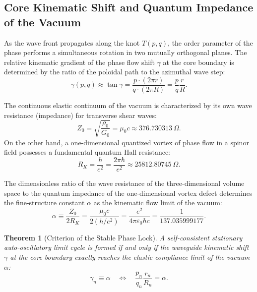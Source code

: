 \documentclass[12pt,a4paper]{article}
\newtheorem{theorem}{Theorem}
\begin{document}
	\subsection{Core Kinematic Shift and Quantum Impedance of the Vacuum}
	As the wave front propagates along the knot $T(p,q)$, the order parameter of the phase performs a simultaneous rotation in two mutually orthogonal planes. The relative kinematic gradient of the phase flow shift $\gamma$ at the core boundary is determined by the ratio of the poloidal path to the azimuthal wave step:
	\begin{equation}
		\gamma(p,q) \approx \tan\gamma = \frac{p \cdot (2\pi r)}{q \cdot (2\pi R)} = \frac{p}{q} \frac{r}{R}.
	\end{equation}
	
	The continuous elastic continuum of the vacuum is characterized by its own wave resistance (impedance) for transverse shear waves:
	\begin{equation}
		Z_0 = \sqrt{\frac{\rho_0}{G_0}} = \mu_0 c \approx 376.730313 \ \Omega.
	\end{equation}
	On the other hand, a one-dimensional quantized vortex of phase flow in a spinor field possesses a fundamental quantum Hall resistance:
	\begin{equation}
		R_K = \frac{h}{e^2} = \frac{2\pi \hbar}{e^2} \approx 25812.80745 \ \Omega.
	\end{equation}
	
	The dimensionless ratio of the wave resistance of the three-dimensional volume space to the quantum impedance of the one-dimensional vortex defect determines the fine-structure constant $\alpha$ as the kinematic flow limit of the vacuum:
	\begin{equation}
		\alpha \equiv \frac{Z_0}{2 R_K} = \frac{\mu_0 c}{2 (h/e^2)} = \frac{e^2}{4\pi \varepsilon_0 \hbar c} = \frac{1}{137.035999177}.
	\end{equation}
	
	\begin{theorem}[Criterion of the Stable Phase Lock]
	A self-consistent stationary auto-oscillatory limit cycle is formed if and only if the waveguide kinematic shift $\gamma$ at the core boundary exactly reaches the elastic compliance limit of the vacuum $\alpha$:
	\begin{equation}
		\gamma_n \equiv \alpha \quad \Longleftrightarrow \quad \frac{p_n}{q_n} \frac{r_n}{R_n} = \alpha.
		\end{equation}
	\end{theorem}
	
\end{document}
